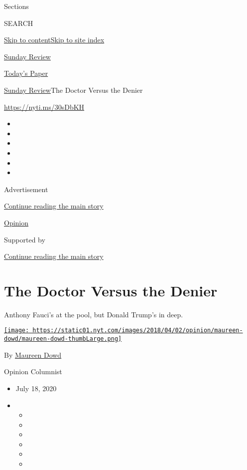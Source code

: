 Sections

SEARCH

\protect\hyperlink{site-content}{Skip to
content}\protect\hyperlink{site-index}{Skip to site index}

\href{https://www.nytimes.com/section/opinion/sunday}{Sunday Review}

\href{https://myaccount.nytimes.com/auth/login?response_type=cookie\&client_id=vi}{}

\href{https://www.nytimes.com/section/todayspaper}{Today's Paper}

\href{/section/opinion/sunday}{Sunday Review}\textbar{}The Doctor Versus
the Denier

\href{https://nyti.ms/30sDbKH}{https://nyti.ms/30sDbKH}

\begin{itemize}
\item
\item
\item
\item
\item
\item
\end{itemize}

Advertisement

\protect\hyperlink{after-top}{Continue reading the main story}

\href{/section/opinion}{Opinion}

Supported by

\protect\hyperlink{after-sponsor}{Continue reading the main story}

\hypertarget{the-doctor-versus-the-denier}{%
\section{The Doctor Versus the
Denier}\label{the-doctor-versus-the-denier}}

Anthony Fauci's at the pool, but Donald Trump's in deep.

\href{https://www.nytimes.com/by/maureen-dowd}{\texttt{[image: https://static01.nyt.com/images/2018/04/02/opinion/maureen-dowd/maureen-dowd-thumbLarge.png]}}

By \href{https://www.nytimes.com/by/maureen-dowd}{Maureen Dowd}

Opinion Columnist

\begin{itemize}
\item
  July 18, 2020
\item
  \begin{itemize}
  \item
  \item
  \item
  \item
  \item
  \item
  \end{itemize}
\end{itemize}

